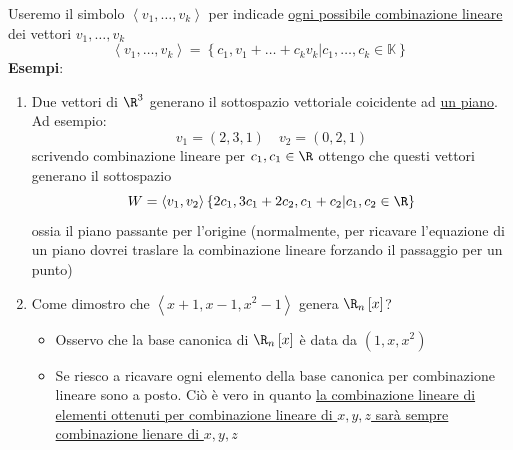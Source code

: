 \documentclass[12pt,a4paper,oneside]{article}
\begin{document}
Useremo il simbolo $ \left<v_1,\ldots,v_k \right>$ per indicade \underline{ogni possibile combinazione lineare} dei vettori $v_1,\ldots,v_k$
\[
	\left<v_1,\ldots , v_k	\right> = \left\{ c_1,v_1+\ldots+c_kv_k | c_1,\ldots,c_k \in  \mathbb{K}\right\}
\]
\textbf{Esempi}:
\begin{enumerate}
	\item Due vettori di $\R^{3}$ generano il sottospazio vettoriale coicidente ad \underline{un piano}. Ad esempio:
	      \[
		      v_1=\left( 2,3,1 \right) \quad v_2=\left( 0,2,1 \right)
	      \]
	      scrivendo combinazione lineare per $c_1,c_1 \in  \R$ ottengo che questi vettori generano il sottospazio
	      \[
		      W = \left<v_1,v_2 \right> \left\{ 2c_1,3c_1+2c_2,c_1+c_2 | c_1,c_2 \in  \R \right\}
	      \]
	      ossia il piano passante per l'origine (normalmente, per ricavare l'equazione di un piano dovrei traslare la combinazione lineare forzando il passaggio per un punto)
	\item Come dimostro che $\left<x+1,x-1, x^2-1 \right>$ genera $\R_n\left[ x \right] $?
	      \begin{itemize}
		      \item Osservo che la base canonica di $\R_n\left[ x \right] $ è data da $\left( 1,x,x^2 \right) $
		      \item Se riesco a ricavare ogni elemento della base canonica per combinazione lineare sono a posto. Ciò è vero in quanto \underline{la combinazione lineare di elementi ottenuti per combinazione lineare di $x,y,z$ sarà sempre combinazione lienare di $x,y,z$}
	      \end{itemize}
\end{enumerate}
\end{document}
